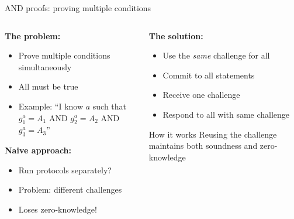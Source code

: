 \documentclass[aspectratio=169, lualatex, handout]{beamer}
\begin{document}
\begin{frame}{AND proofs: proving multiple conditions}
	\begin{columns}[c]
		\begin{column}{0.5\textwidth}
			\textbf{The problem:}
			\begin{itemize}
				\item Prove multiple conditions simultaneously
				\item All must be true
				\item Example: ``I know $a$ such that $g_1^a = A_1$ AND $g_2^a = A_2$ AND $g_3^a = A_3$''
			\end{itemize}
			\textbf{Naive approach:}
			\begin{itemize}
				\item Run protocols separately?
				\item Problem: different challenges
				\item Loses zero-knowledge!
			\end{itemize}
		\end{column}
		\begin{column}{0.5\textwidth}
			\textbf{The solution:}
			\begin{itemize}
				\item Use the \textit{same} challenge for all
				\item Commit to all statements
				\item Receive one challenge
				\item Respond to all with same challenge
			\end{itemize}
			\vspace{0.5em}
			\begin{exampleblock}{How it works}
				Reusing the challenge maintains both soundness and zero-knowledge
			\end{exampleblock}
		\end{column}
	\end{columns}
\end{frame}
\end{document}
